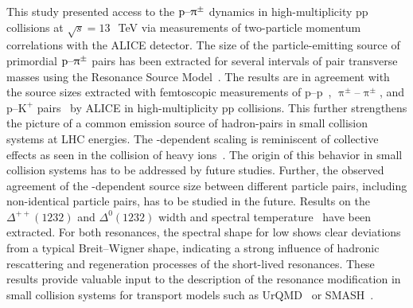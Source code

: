 \documentclass[ALICE,manyauthors]{cernphprep}
\begin{document}
\label{s:Conclusion}
This study presented access to the $\text{p--}\uppi^\pm$ dynamics in high-multiplicity pp collisions at $\sqrt{s} = 13~$~TeV via measurements of two-particle momentum correlations with the ALICE detector. The size of the particle-emitting source of primordial $\text{p--}\uppi^\pm$ pairs has been extracted for several intervals of pair transverse masses \mtText{}  using the Resonance Source Model~\cite{ppSourceErratum}. The results are in agreement with the source sizes extracted with femtoscopic measurements of p--p~\cite{ppSourceErratum}, $\uppi^\pm$--$\uppi^\pm$, and p--$\text{K}^+$ pairs~\cite{ALICE:2023sjd} by ALICE in high-multiplicity pp collisions. This further strengthens the picture of a common emission source of hadron-pairs in small collision systems at LHC energies. The \mtText-dependent scaling is reminiscent of collective effects as seen in the collision of heavy ions~\cite{Lisa:2005dd, Chojnacki:2011hb, Kisiel:2014upa, Shapoval:2014wya}. The origin of this behavior in small collision systems has to be addressed by future studies. Further, the observed agreement of the \mtText-dependent source size between different particle pairs, including non-identical particle pairs, has to be studied in the future. Results on the $\Delta^{++}(1232)$ and $\Delta^{0}(1232)$ width and spectral temperature~\cite{ Reichert:2019lny, Reichert:2022uha} have been extracted. For both resonances, the spectral shape for low \mtText{} shows clear deviations from a typical Breit--Wigner shape, indicating a strong influence of hadronic rescattering and regeneration processes of the short-lived resonances. These results provide valuable input to the description of the resonance modification in small collision systems for transport models such as UrQMD~\cite{Bass:1998ca, Bleicher:1999xi} or SMASH~\cite{Petersen:2018jag}.
\end{document}

